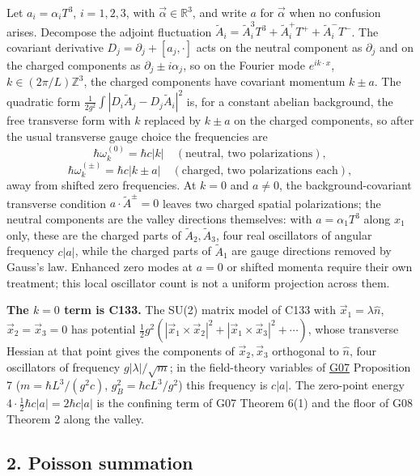 \documentclass[11pt,a4paper]{article}
\begin{document}
Let \(a_i=\alpha_iT^3\), \(i=1,2,3\), with \(\vec\alpha\in\mathbb R^3\),
and write \(a\) for \(\vec\alpha\) when no confusion arises. Decompose
the adjoint fluctuation
\(\tilde A_i=\tilde A_i^3T^3+\tilde A_i^+T^++\tilde A_i^-T^-\). The
covariant derivative \(D_j=\partial_j+[a_j,\cdot]\) acts on the neutral
component as \(\partial_j\) and on the charged components as
\(\partial_j\pm i\alpha_j\), so on the Fourier mode \(e^{ik\cdot x}\),
\(k\in(2\pi/L)\mathbb Z^3\), the charged components have covariant
momentum \(k\pm a\). The quadratic form
\(\frac1{2g^2}\int|D_i\tilde A_j-D_j\tilde A_i|^2\) is, for a constant
abelian background, the free transverse form with \(k\) replaced by
\(k\pm a\) on the charged components, so after the usual transverse
gauge choice the frequencies are
\[\hbar\omega^{(0)}_k=\hbar c|k|\quad(\text{neutral, two polarizations}),\]
\[\hbar\omega^{(\pm)}_k=\hbar c|k\pm a|\quad(\text{charged, two polarizations each}),\]
away from shifted zero frequencies. At \(k=0\) and \(a\ne0\), the
background-covariant transverse condition \(a\cdot\tilde A^{\pm}=0\)
leaves two charged spatial polarizations; the neutral components are the
valley directions themselves: with \(a=\alpha_1T^3\) along \(x_1\) only,
these are the charged parts of \(\tilde A_2,\tilde A_3\), four real
oscillators of angular frequency \(c|a|\), while the charged parts of
\(\tilde A_1\) are gauge directions removed by Gauss's law. Enhanced
zero modes at \(a=0\) or shifted momenta require their own treatment;
this local oscillator count is not a uniform projection across them.

\textbf{The \(k=0\) term is C133.} The SU(2) matrix model of C133 with
\(\vec x_1=\lambda\hat n\), \(\vec x_2=\vec x_3=0\) has potential
\(\tfrac12g^2(|\vec x_1\times\vec x_2|^2+|\vec x_1\times\vec x_3|^2+\cdots)\),
whose transverse Hessian at that point gives the components of
\(\vec x_2,\vec x_3\) orthogonal to \(\hat n\), four oscillators of
frequency \(g|\lambda|/\sqrt m\); in the field-theory variables of
\href{low-dimensional-mass-gap.md}{G07} Proposition 7
(\(m=\hbar L^3/(g^2c)\), \(g_B^2=\hbar cL^3/g^2\)) this frequency is
\(c|a|\). The zero-point energy \(4\cdot\tfrac12\hbar c|a|=2\hbar c|a|\)
is the confining term of G07 Theorem 6(1) and the floor of G08 Theorem 2
along the valley.

\hypertarget{poisson-summation}{%
\subsection{2. Poisson summation}\label{poisson-summation}}
\end{document}
